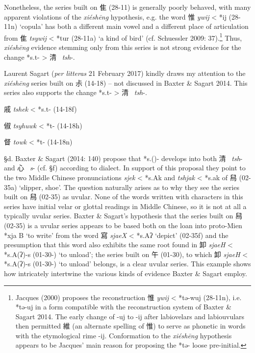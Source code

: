 Nonetheless, the series built on 隹 (28-11) is generally poorly behaved,
with many apparent violations of the \emph{xiéshēng} hypothesis, e.g.
the word 惟  \emph{ywij} \textless{} *{}ij (28-11n) `copula' has both a
different main vowel and a different place of articulation from 隹
 \emph{tsywij} \textless{} *tur (28-11a) `a kind of bird' (cf. Schuessler
2009: 37).\footnote{Jacques (2000) proposes the reconstruction 惟
   \emph{ywij} \textless{} *tə-wuj (28-11n), i.e. *tə-{}uj in a form
  compatible with the reconstruction system of Baxter \& Sagart 2014.
  The early change of -uj to -ij after labiovelars and labiouvulars then
  permitted 維 (an alternate spelling of 惟) to serve as phonetic in
  words with the etymological rime -ij. Conformation to the
   \emph{xiéshēng} hypothesis appears to be Jacques' main reason for
  proposing the *tə- loose pre-initial.} Thus,  \emph{xiéshēng} evidence
stemming only from this series is not strong evidence for the change
*s.t{}{}- \textgreater{} 清~ \emph{tsh}-.

Laurent Sagart (\emph{per litteras} 21 February 2017) kindly draws my
attention to the \emph{xiéshēng} series built on 尗 (14-18) -- not
discussed in Baxter \& Sagart 2014. This series also supports the change
*s.t{}{}- \textgreater{} 清~ \emph{tsh}-.

\begin{description} \item
戚  \emph{tshek} \textless{} *s.t{}{}- (14-18f)
\item
俶  \emph{tsyhuwk} \textless{} *t{}- (14-18h)
 \item
督  \emph{towk} \textless{} *t- (14-18n)
\end{description}

§d. Baxter \& Sagart (2014: 140) propose that *s.{}({})- develops into
both 清~ \emph{tsh}- and 心~ \emph{s}- (cf. §f) according to dialect. In
support of this proposal they point to the two Middle Chinese
pronunciations \emph{sjek} \textless{} *s.{}Ak and \emph{tshjak}
\textless{} *s.{}ak of 舄 (02-35a) `slipper, shoe'. The question
naturally arises as to why they see the series built on 舄 (02-35) as
uvular. None of the words written with characters in this series have
initial velar or glottal readings in Middle Chinese, so it is not at all
a typically uvular series. Baxter \& Sagart's hypothesis that the series
built on 舄 (02-35) is a uvular series appears to be based both on the
loan into proto-Mien *xja B `to write' from the word 寫 \emph{sjaeX}
\textless{} *s.{}Aʔ `depict' (02-35f) and the presumption that this word
also exhibits the same root found in 卸  \emph{sjaeH} \textless{}
*s.{}A(ʔ)-s (01-30-) `to unload'; the series built on 午 (01-30), to
which 卸  \emph{sjaeH} \textless{} *s.{}A(ʔ)-s (01-30-) `to unload'
belongs, is a clear uvular series. This example shows how intricately
intertwine the various kinds of evidence Baxter \& Sagart employ.

